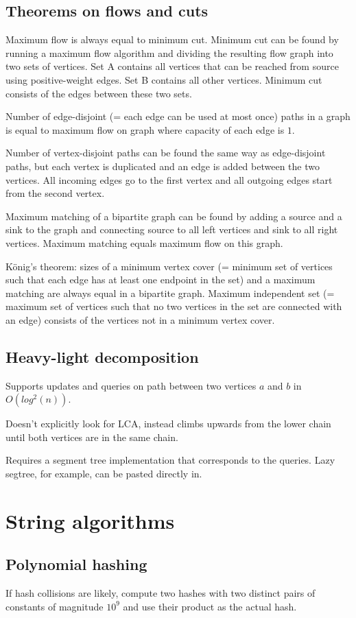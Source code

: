 \documentclass{article}
\begin{document}


\subsection {Theorems on flows and cuts}

Maximum flow is always equal to minimum cut. Minimum cut can be found by running a maximum flow algorithm and dividing the resulting flow graph into two sets of vertices. Set A contains all vertices that can be reached from source using positive-weight edges. Set B contains all other vertices. Minimum cut consists of the edges between these two sets.

Number of edge-disjoint (= each edge can be used at most once) paths in a graph is equal to maximum flow on graph where capacity of each edge is $1$.

Number of vertex-disjoint paths can be found the same way as edge-disjoint paths, but each vertex is duplicated and an edge is added between the two vertices. All incoming edges go to the first vertex and all outgoing edges start from the second vertex.

Maximum matching of a bipartite graph can be found by adding a source and a sink to the graph and connecting source to all left vertices and sink to all right vertices. Maximum matching equals maximum flow on this graph.

König's theorem: sizes of a minimum vertex cover (= minimum set of vertices such that each edge has at least one endpoint in the set) and a maximum matching are always equal in a bipartite graph. Maximum independent set (= maximum set of vertices such that no two vertices in the set are connected with an edge) consists of the vertices not in a minimum vertex cover.

\subsection {Heavy-light decomposition}

Supports updates and queries on path between two vertices $a$ and $b$ in $O(log^2(n))$.

Doesn't explicitly look for LCA, instead climbs upwards from the lower chain until both vertices are in the same chain.

Requires a segment tree implementation that corresponds to the queries. Lazy segtree, for example, can be pasted directly in.



\section {String algorithms}

\subsection {Polynomial hashing}

If hash collisions are likely, compute two hashes with two distinct pairs of constants of magnitude $10^9$ and use their product as the actual hash.


\end{document}
